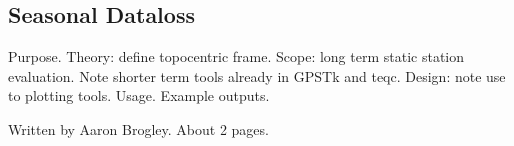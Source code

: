 \subsection*{Seasonal Dataloss}

Purpose. Theory: define topocentric frame. Scope: long term static station evaluation. Note shorter term tools already in GPSTk and teqc. Design: note use to plotting tools. Usage. Example outputs.

Written by Aaron Brogley. About 2 pages.

